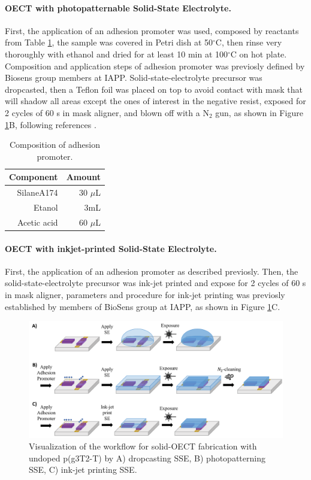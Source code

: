 \paragraph{OECT with photopatternable Solid-State Electrolyte.}First, the application of an adhesion promoter was used, composed by reactants from Table \ref{tab:adprom}, the sample was covered in Petri dish at 50$^{\circ}$C, then rinse very thoroughly with ethanol and dried for at least 10 min at 100$^{\circ}$C on hot plate. Composition and application steps of adhesion promoter was previosly defined by Biosens group members at IAPP. Solid-state-electrolyte precursor was dropcasted, then a Teflon foil was placed on top to avoid contact with mask that will shadow all areas except the ones of interest in the negative resist, exposed for 2 cycles of 60 s in mask aligner, and blown off with a N$_{2}$ gun, as shown in Figure \ref{fig:undopedsse}B,  following references \cite{weissbachPhotopatternableSolidElectrolyte2022}\cite{bongartzOrganicElectrochemicalTransistors2021}.

\begin{table}[h]
	\centering
	\caption{Composition of adhesion promoter.}
	\begin{tabular}{r r} \hline
		Component   & Amount \\ \hline
		SilaneA174	& 30 $\mu$L \\ 
		Etanol   & 3mL \\ 
		Acetic acid   & 60 $\mu$L \\ \hline
	\end{tabular}
	\label{tab:adprom}
\end{table}

\paragraph{OECT with inkjet-printed Solid-State Electrolyte.}First, the application of an adhesion promoter as described previosly. Then, the solid-state-electrolyte precursor was ink-jet printed and expose for 2 cycles of 60 s in mask aligner, parameters and procedure for ink-jet printing was previosly established by members of BioSens group at IAPP, as shown in Figure \ref{fig:undopedsse}C. 

\begin{figure}[!ht]
	\centering
	\includegraphics[width=\textwidth]{Images/pdf/undoped-sse.pdf}
	\caption[Solid-OECT fabrication with undoped p(g3T2-T)]{Visualization of the workflow for solid-OECT fabrication with undoped p(g3T2-T) by A) dropcasting SSE, B) photopatterning SSE, C) ink-jet printing SSE.}
	\label{fig:undopedsse}
\end{figure}


